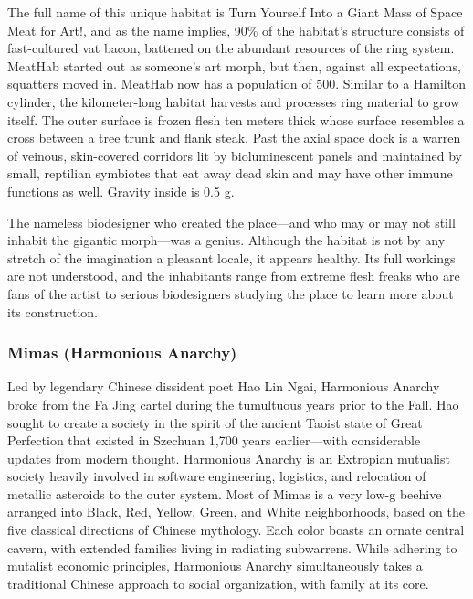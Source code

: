 The full name of this unique habitat is Turn Yourself Into a Giant
Mass of Space Meat for Art!, and as the name implies, 90\% of the
habitat's structure consists of fast-cultured vat bacon, battened on
the abundant resources of the ring system. MeatHab started out as
someone's art morph, but then, against all expectations, squatters
moved in. MeatHab now has a population of 500. Similar to a Hamilton
cylinder, the kilometer-long habitat harvests and processes ring
material to grow itself. The outer surface is frozen flesh ten meters
thick whose surface resembles a cross between a tree trunk and flank
steak. Past the axial space dock is a warren of veinous, skin-covered
corridors lit by bioluminescent panels and maintained by small,
reptilian symbiotes that eat away dead skin and may have other immune
functions as well. Gravity inside is 0.5 g.

The nameless biodesigner who created the place—and who may or may not
still inhabit the gigantic morph—was a genius. Although the habitat is
not by any stretch of the imagination a pleasant locale, it appears
healthy. Its full workings are not understood, and the inhabitants
range from extreme flesh freaks who are fans of the artist to serious
biodesigners studying the place to learn more about its construction.

\subsubsection{Mimas (Harmonious Anarchy)}
\label{sec:mimas-harm-anarchy}

Led by legendary Chinese dissident poet Hao Lin Ngai, Harmonious
Anarchy broke from the Fa Jing cartel during the tumultuous years
prior to the Fall.  Hao sought to create a society in the spirit of
the ancient Taoist state of Great Perfection that existed in Szechuan
1,700 years earlier—with considerable updates from modern
thought. Harmonious Anarchy is an Extropian mutualist society heavily
involved in software engineering, logistics, and relocation of
metallic asteroids to the outer system. Most of Mimas is a very low-g
beehive arranged into Black, Red, Yellow, Green, and White
neighborhoods, based on the five classical directions of Chinese
mythology. Each color boasts an ornate central cavern, with extended
families living in radiating subwarrens. While adhering to mutalist
economic principles, Harmonious Anarchy simultaneously takes a
traditional Chinese approach to social organization, with family at
its core.

